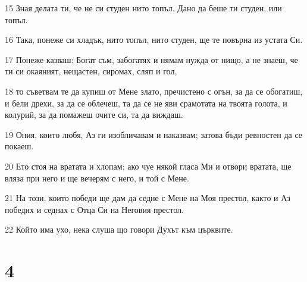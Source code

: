 \par 15 Зная делата ти, че не си студен нито топъл. Дано да беше ти студен, или топъл.
\par 16 Така, понеже си хладък, нито топъл, нито студен, ще те повърна из устата Си.
\par 17 Понеже казваш: Богат съм, забогатях и нямам нужда от нищо, а не знаеш, че ти си окаяният, нещастен, сиромах, сляп и гол,
\par 18 то съветвам те да купиш от Мене злато, пречистено с огън, за да се обогатиш, и бели дрехи, за да се облечеш, та да се не яви срамотата на твоята голота, и колурий, за да помажеш очите си, та да виждаш.
\par 19 Ония, които любя, Аз ги изобличавам и наказвам; затова бъди ревностен да се покаеш.
\par 20 Ето стоя на вратата и хлопам; ако чуе някой гласа Ми и отвори вратата, ще вляза при него и ще вечерям с него, и той с Мене.
\par 21 На този, които победи ще дам да седне с Мене на Моя престол, както и Аз победих и седнах с Отца Си на Неговия престол.
\par 22 Който има ухо, нека слуша що говори Духът към църквите.

\chapter{4}

